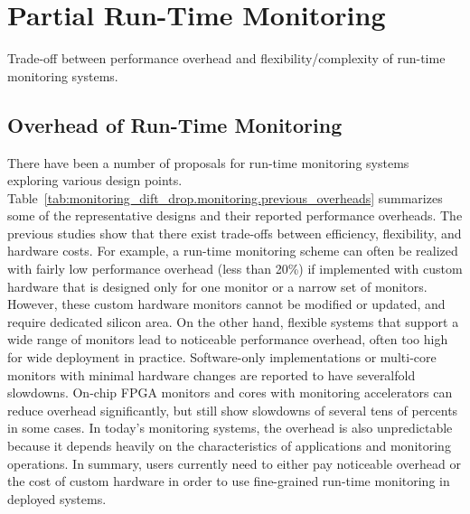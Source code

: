 \section{Partial Run-Time Monitoring}
\label{sec:monitoring_dift_drop.monitoring}

\begin{table}
  \begin{center}
    \begin{footnotesize}
    
    \end{footnotesize}
    \caption{Trade-off between performance overhead and flexibility/complexity
    of run-time monitoring systems.}
    \label{tab:monitoring_dift_drop.monitoring.previous_overheads}
  \end{center}
\end{table}

\subsection{Overhead of Run-Time Monitoring}

There have been a number of proposals for run-time monitoring systems exploring
various design points.
Table~\ref{tab:monitoring_dift_drop.monitoring.previous_overheads} summarizes
some of the representative designs and their reported performance overheads.
The previous studies show that there exist trade-offs between
efficiency, flexibility, and hardware costs.  For example, a run-time
monitoring scheme can often be realized with fairly low performance overhead
(less than 20\%) if implemented with custom hardware that is designed only for
one monitor or a narrow set of monitors. However, these custom hardware monitors
cannot be modified or updated, and require dedicated silicon area.  On the
other hand, flexible systems that support a wide range of monitors lead to
noticeable performance overhead, often too high for wide deployment in
practice.  Software-only implementations \cite{nagarajan-interact08,
lift-micro06, purify-usenix92, taintcheck-ndsss05} or multi-core monitors with
minimal hardware changes \cite{lba-asid06} are reported to have severalfold
slowdowns.  On-chip FPGA monitors \cite{flexcore-micro10} and cores with
monitoring accelerators \cite{lba-isca08, fade-hpca14} can reduce overhead
significantly, but still show slowdowns of several tens of percents in some
cases.  In today's monitoring systems, the overhead is also unpredictable
because it depends heavily on the characteristics of applications and
monitoring operations.  In summary, users currently need to either pay
noticeable overhead or the cost of custom hardware in order to use fine-grained
run-time monitoring in deployed systems.

